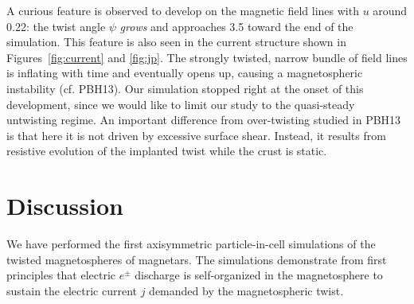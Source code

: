 A curious feature is observed to develop on the magnetic field lines with $u$
around 0.22: the twist angle $\psi$ {\it grows} and approaches 3.5 toward the end
of the simulation. This feature is also seen in the current structure shown
in Figures~\ref{fig:current} and \ref{fig:jp}. The strongly twisted, narrow bundle
of field lines is inflating with time and eventually opens up, causing a
magnetospheric instability (cf. PBH13).
Our simulation stopped right
 at the onset of this development, since we would like to limit our study to the
 quasi-steady untwisting regime.
An important difference from over-twisting studied in PBH13
is that here it is not driven by excessive surface shear. Instead, it results from
resistive evolution of the implanted twist while the crust is static.



\section{Discussion}
\label{sec:discussion}


We have performed the first axisymmetric particle-in-cell simulations of the
twisted magnetospheres of magnetars. The simulations demonstrate from
first principles that electric $e^\pm$ discharge is self-organized in the magnetosphere
to sustain the electric current $j$ demanded by the magnetospheric twist.

